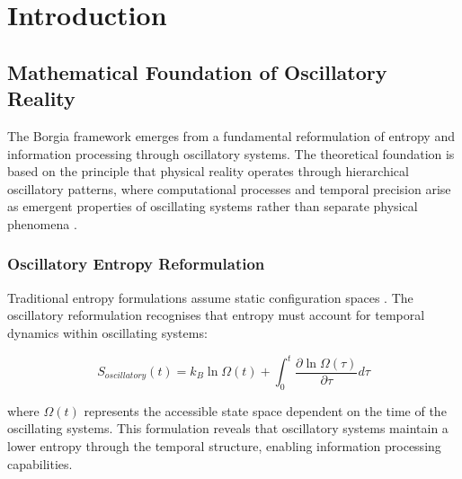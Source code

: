 \documentclass[12pt,a4paper]{article}
\begin{document}
\tableofcontents

\section{Introduction}

\subsection{Mathematical Foundation of Oscillatory Reality}

The Borgia framework emerges from a fundamental reformulation of entropy and information processing through oscillatory systems. The theoretical foundation is based on the principle that physical reality operates through hierarchical oscillatory patterns, where computational processes and temporal precision arise as emergent properties of oscillating systems rather than separate physical phenomena \cite{sterling2015principles}.

\subsubsection{Oscillatory Entropy Reformulation}

Traditional entropy formulations assume static configuration spaces \cite{landauer1961irreversibility,bennett1982thermodynamics}. The oscillatory reformulation recognises that entropy must account for temporal dynamics within oscillating systems:

\begin{equation}
S_{oscillatory}(t) = k_B \ln \Omega(t) + \int_0^t \frac{\partial \ln \Omega(\tau)}{\partial \tau} d\tau
\end{equation}

where $\Omega(t)$ represents the accessible state space dependent on the time of the oscillating systems. This formulation reveals that oscillatory systems maintain a lower entropy through the temporal structure, enabling information processing capabilities.
\end{document}
